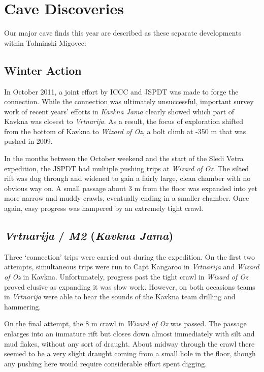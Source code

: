 
\section{Cave Discoveries}

Our major cave finds this year are described as these separate
developments within Tolminski Migovec:


\subsection{Winter Action}

In October 2011, a joint effort by ICCC and JSPDT was made to forge the
connection. While the connection was ultimately unsuccessful, important
survey work of recent years' efforts in \emph{Kavkna Jama} clearly
showed which part of Kavkna was closest to \emph{Vrtnarija}. As a
result, the focus of exploration shifted from the bottom of Kavkna to
\emph{Wizard of Oz}, a bolt climb at -350 m that was pushed in 2009.

In the months between the October weekend and the start of the Sledi
Vetra expedition, the JSPDT had multiple pushing trips at \emph{Wizard
of Oz}. The silted rift was dug through and widened to gain a fairly
large, clean chamber with no obvious way on. A small passage about 3 m
from the floor was expanded into yet more narrow and muddy crawls,
eventually ending in a smaller chamber. Once again, easy progress was
hampered by an extremely tight crawl.


\subsection{\texorpdfstring{\emph{Vrtnarija} / \emph{M2} (\emph{Kavkna
Jama})}{Vrtnarija / M2 (Kavkna Jama)}}

Three `connection' trips were carried out during the expedition. On the
first two attempts, simultaneous trips were run to Capt Kangaroo in
\emph{Vrtnarija} and \emph{Wizard of Oz} in Kavkna. Unfortunately,
progress past the tight crawl in \emph{Wizard of Oz} proved elusive as
expanding it was slow work. However, on both occasions teams in
\emph{Vrtnarija} were able to hear the sounds of the Kavkna team
drilling and hammering.

On the final attempt, the 8 m crawl in \emph{Wizard of Oz} was passed.
The passage enlarges into an immature rift but closes down almost
immediately with silt and mud flakes, without any sort of draught. About
midway through the crawl there seemed to be a very slight draught coming
from a small hole in the floor, though any pushing here would require
considerable effort spent digging.


